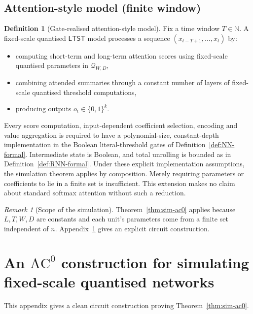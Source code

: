 \documentclass[11pt]{article}
\newcommand{\AC}{\mathrm{AC}}
\newcommand{\LTST}{\mathsf{LTST}}
\newcommand{\bits}{\{0,1\}}
\newcommand{\N}{\mathbb{N}}
\newcommand{\Qset}{\mathcal{Q}}
\theoremstyle{plain}
\theoremstyle{definition}
\newtheorem{definition}[theorem]{Definition}
\theoremstyle{remark}
\newtheorem{remark}[theorem]{Remark}
\numberwithin{equation}{section}
\begin{document}
\subsection{Attention-style model (finite window)}
\label{app:LTST}

\begin{definition}[Gate-realised attention-style model]
\label{def:LTST-formal}
Fix a time window $T\in\N$.
A fixed-scale quantised $\LTST$ model processes a sequence $(x_{t-T+1},\dots,x_t)$ by:
\begin{itemize}[leftmargin=*]
\item computing short-term and long-term attention scores using fixed-scale quantised parameters in $\Qset_{W,D}$,
\item combining attended summaries through a constant number of layers of fixed-scale quantised threshold computations,
\item producing outputs $o_t\in\bits^k$.
\end{itemize}
Every score computation, input-dependent coefficient selection, encoding and value aggregation is required to have a polynomial-size, constant-depth implementation in the Boolean literal-threshold gates of Definition~\ref{def:NN-formal}. Intermediate state is Boolean, and total unrolling is bounded as in Definition~\ref{def:RNN-formal}. Under these explicit implementation assumptions, the simulation theorem applies by composition. Merely requiring parameters or coefficients to lie in a finite set is insufficient. This extension makes no claim about standard softmax attention without such a reduction.
\end{definition}

\begin{remark}[Scope of the simulation]
Theorem~\ref{thm:sim-ac0} applies because $L,T,W,D$ are constants and each unit’s parameters come from a finite set independent of $n$.
Appendix~\ref{app:ac0proof} gives an explicit circuit construction.
\end{remark}

\section{An \texorpdfstring{$\AC^0$}{AC0} construction for simulating fixed-scale quantised networks}
\label{app:ac0proof}

This appendix gives a clean circuit construction proving Theorem~\ref{thm:sim-ac0}.
\end{document}
